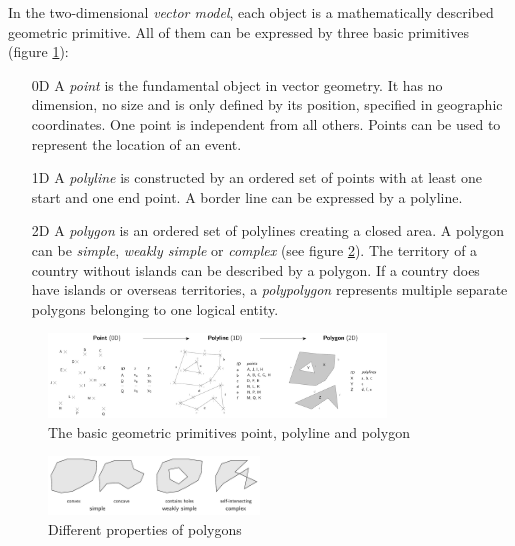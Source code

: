 In the two-dimensional \emph{vector model}, each object is a mathematically described geometric primitive. All of them can be expressed by three basic primitives (figure \ref{fig:geometric_primitives}):
\begin{enumerate}
  \item[0D] A \emph{point} is the fundamental object in vector geometry. It has no dimension, no size and is only defined by its position, specified in geographic coordinates. One point is independent from all others. Points can be used to represent the location of an event.
  \item[1D] A \emph{polyline} is constructed by an ordered set of points with at least one start and one end point. A border line can be expressed by a polyline.
  \item[2D] A \emph{polygon} is an ordered set of polylines creating a closed area. A polygon can be \emph{simple}, \emph{weakly simple} or \emph{complex} (see figure \ref{fig:polygon_properties}). The territory of a country without islands can be described by a polygon. If a country does have islands or overseas territories, a \emph{polypolygon} represents multiple separate polygons belonging to one logical entity.
\end{enumerate}

\begin{figure}[H]
  \centering
  \includegraphics[width=0.8\textwidth]{graphics/basics/geometric_primitives}
  \caption{The basic geometric primitives point, polyline and polygon}
  \label{fig:geometric_primitives}
\end{figure}


\begin{figure}[H]
  \centering
  \includegraphics[width=0.5\textwidth]{graphics/basics/polygon_properties}
  \caption{Different properties of polygons}
  \label{fig:polygon_properties}
\end{figure}

